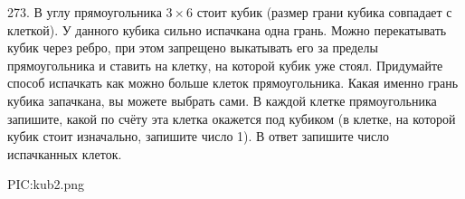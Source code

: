 273. В углу прямоугольника $3\times6$ стоит кубик (размер грани кубика совпадает с клеткой). У данного кубика сильно испачкана одна грань. Можно перекатывать кубик через ребро, при этом запрещено выкатывать его за пределы прямоугольника и ставить на клетку, на которой кубик уже стоял. Придумайте способ испачкать как можно больше клеток прямоугольника. Какая именно грань кубика запачкана, вы можете выбрать сами. В каждой клетке прямоугольника запишите, какой по счёту эта клетка окажется под кубиком (в клетке, на которой кубик стоит изначально, запишите число 1). В ответ запишите число испачканных клеток.
\begin{center}
{{PIC:kub2.png}}
\end{center}
